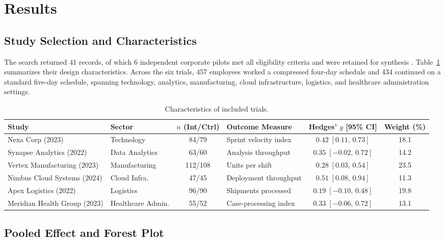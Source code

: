 \section{Results}

\subsection{Study Selection and Characteristics}

The search returned 41 records, of which 6 independent corporate pilots met all eligibility
criteria and were retained for synthesis \citep{chandrasekaran2023nexa, lindqvist2022synapse,
ferreira2023vertex, okafor2024nimbus, rahman2022apex, vogel2023meridian}. Table~\ref{tab:studies}
summarizes their design characteristics. Across the six trials, 457 employees worked a
compressed four-day schedule and 434 continued on a standard five-day schedule, spanning
technology, analytics, manufacturing, cloud infrastructure, logistics, and healthcare
administration settings.

\begin{table}[htbp]
\centering
\footnotesize
\caption{Characteristics of included trials.}
\label{tab:studies}
\begin{tabular}{>{\raggedright\arraybackslash}p{2.3cm} >{\raggedright\arraybackslash}p{2.1cm} c >{\raggedright\arraybackslash}p{2.1cm} c c}
\toprule
Study & Sector & $n$ (Int/Ctrl) & Outcome Measure & Hedges' $g$ [95\% CI] & Weight (\%) \\
\midrule
Nexa Corp (2023) & Technology & 84/79 & Sprint velocity index & $0.42\;[0.11,\,0.73]$ & 18.1 \\
Synapse Analytics (2022) & Data Analytics & 63/60 & Analysis throughput & $0.35\;[-0.02,\,0.72]$ & 14.2 \\
Vertex Manufacturing (2023) & Manufacturing & 112/108 & Units per shift & $0.28\;[0.03,\,0.54]$ & 23.5 \\
Nimbus Cloud Systems (2024) & Cloud Infra. & 47/45 & Deployment throughput & $0.51\;[0.08,\,0.94]$ & 11.3 \\
Apex Logistics (2022) & Logistics & 96/90 & Shipments processed & $0.19\;[-0.10,\,0.48]$ & 19.8 \\
Meridian Health Group (2023) & Healthcare Admin. & 55/52 & Case-processing index & $0.33\;[-0.06,\,0.72]$ & 13.1 \\
\bottomrule
\end{tabular}
\end{table}

\subsection{Pooled Effect and Forest Plot}

